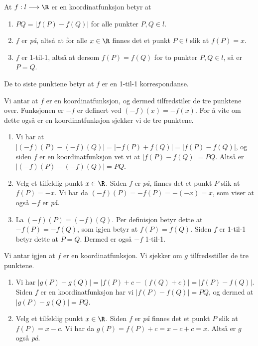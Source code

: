 

\begin{oppgave}[3.2.12]
  At $f:l\longrightarrow \R$ er en koordinatfunksjon betyr at 
  \begin{enumerate}
      \item $PQ=|f(P)-f(Q)|$ for alle punkter $P, Q\in l$. 
      
      \item $f$ er \emph{på}, altså at for alle $x\in \R$ finnes det et punkt $P\in l$ 
      slik at $f(P)=x$.
      
      \item $f$ er 1-til-1, altså at dersom $f(P)=f(Q)$ for to punkter $P, Q\in l$, så
      er $P=Q$. 
  \end{enumerate}
  De to siste punktene betyr at $f$ er en 1-til-1 korrespondanse. 

  \begin{punkt}
    Vi antar at $f$ er en koordinatfunksjon, og dermed tilfredstiler de tre punktene over. 
    Funksjonen er $-f$ er definert ved $(-f)(x)=-f(x)$. For å vite om dette også er en 
    koordinatfunksjon sjekker vi de tre punktene. 
    \begin{enumerate}
        \item Vi har at $|(-f)(P)-(-f)(Q)|=|-f(P)+f(Q)|=|f(P)-f(Q)|$, og siden $f$ er en 
        koordinatfunksjon vet vi at $|f(P)-f(Q)|=PQ$. Altså er $|(-f)(P)-(-f)(Q)| =PQ$. 
        
        \item Velg et tilfeldig punkt $x\in \R$. Siden $f$ er \emph{på}, finnes det et 
        punkt $P$ slik at $f(P)=-x$. Vi har da $(-f)(P) = -f(P)=-(-x)=x$, som viser at 
        også $-f$ er \emph{på}.
        
        \item La $(-f)(P)=(-f)(Q)$. Per definisjon betyr dette at $-f(P)=-f(Q)$, som igjen
        betyr at $f(P)=f(Q)$. Siden $f$ er 1-til-1 betyr dette at $P=Q$. Dermed er også $-f$
        1-til-1. 
    \end{enumerate}
  \end{punkt}

  \begin{punkt}
    Vi antar igjen at $f$ er en koordinatfunksjon. Vi sjekker om $g$ tilfredsstiller de 
    tre punktene. 
    \begin{enumerate}
        \item Vi har $|g(P)-g(Q)|=|f(P)+c - (f(Q)+c)|=|f(P)-f(Q)|$. Siden $f$ er en 
        koordinatfunksjon har vi $|f(P)-f(Q)|=PQ$, og dermed at $|g(P)-g(Q)|=PQ$. 
        \item Velg et tilfeldig punkt $x\in \R$. Siden $f$ er \emph{på} finnes det et 
        punkt $P$ slik at $f(P)=x-c$. Vi har da $g(P)=f(P)+c = x-c+c = x$. Altså er 
        $g$ også \emph{på}. 
        

\end{enumerate}
\end{punkt}
\end{oppgave}
